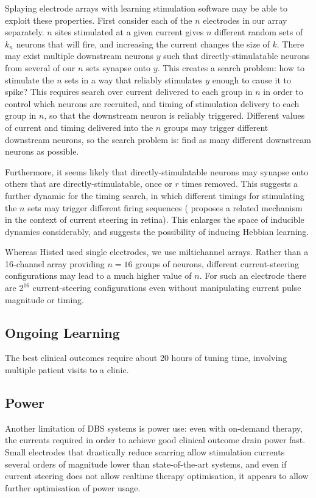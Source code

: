 \documentclass[10pt,letterpaper]{article}
\let\oldmarginpar\marginpar
\renewcommand{\marginpar}[1]{\oldmarginpar{\linespread{1}\scriptsize{#1}}}
\begin{document}
Splaying electrode arrays with learning stimulation software may be
able to exploit these properties.  First consider each of the $n$
electrodes in our array separately.  $n$ sites stimulated at a given
current gives $n$ different random sets of $k_n$ neurons that will
fire, and increasing the current changes the size of $k$.  There may
exist multiple downstream neurons $y$ such that directly-stimulatable
neurons from several of our $n$ sets synapse onto $y$.  This creates a
search problem: how to stimulate the $n$ sets in a way that reliably
stimulates $y$ enough to cause it to spike?  This requires search over
current delivered to each group in $n$ in order to control which
neurons are recruited, and timing of stimulation delivery to each
group in $n$, so that the downstream neuron is reliably triggered.
Different values of current and timing delivered into the $n$ groups
may trigger different downstream neurons, so the search problem is:
find as many different downstream neurons as possible.

Furthermore, it seems likely that directly-stimulatable neurons may
synapse onto others that are directly-stimulatable, once or $r$ times
removed.  This suggests a further dynamic for the timing search, in
which different timings for stimulating the $n$ sets may trigger
different firing sequences (\cite{Jepson2014steering_in_retina}
proposes a related mechanism in the context of current steering in
retina).  This enlarges the space of inducible dynamics considerably,
and suggests the possibility of inducing Hebbian learning.

Whereas Histed used single electrodes, we use miltichannel arrays.
Rather than a 16-channel array providing $n=16$ groups of neurons,
different current-steering configurations may lead to a much higher
value of $n$.  For such an electrode there are $2^{16}$
current-steering configurations even without manipulating current
pulse magnitude or timing.

\subsection{Ongoing Learning}

The best clinical outcomes require about 20 hours\marginpar{Now where
  did I read this\dots?} of tuning time, involving multiple patient
visits to a clinic.

\subsection{Power}

Another limitation of DBS systems is power use: even with on-demand
therapy, the currents required in order to achieve good clinical
outcome drain power fast.  Small electrodes that drastically reduce
scarring allow stimulation currents several orders of magnitude lower
than state-of-the-art systems, and even if current steering does not
allow realtime therapy optimisation, it appears to allow further
optimisation of power usage.


\end{document}
